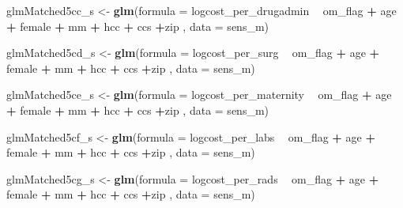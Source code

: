 \documentclass[]{article}
\newenvironment{Shaded}{\begin{snugshade}}{\end{snugshade}}
\newcommand{\KeywordTok}[1]{\textcolor[rgb]{0.13,0.29,0.53}{\textbf{#1}}}
\newcommand{\DataTypeTok}[1]{\textcolor[rgb]{0.13,0.29,0.53}{#1}}
\newcommand{\StringTok}[1]{\textcolor[rgb]{0.31,0.60,0.02}{#1}}
\newcommand{\OperatorTok}[1]{\textcolor[rgb]{0.81,0.36,0.00}{\textbf{#1}}}
\newcommand{\NormalTok}[1]{#1}
\begin{document}
\begin{Shaded}
\begin{Highlighting}[]
\NormalTok{glmMatched5cc_s <-}\StringTok{ }\KeywordTok{glm}\NormalTok{(}\DataTypeTok{formula =}\NormalTok{ logcost_per_drugadmin }\OperatorTok{~}\StringTok{ }\NormalTok{om_flag }\OperatorTok{+}\StringTok{ }\NormalTok{age }\OperatorTok{+}\StringTok{ }\NormalTok{female }\OperatorTok{+}\StringTok{ }\NormalTok{mm }\OperatorTok{+}\StringTok{ }\NormalTok{hcc }\OperatorTok{+}\StringTok{ }\NormalTok{ccs }\OperatorTok{+}\NormalTok{zip ,}
                     \DataTypeTok{data    =}\NormalTok{ sens_m)}

\NormalTok{glmMatched5cd_s <-}\StringTok{ }\KeywordTok{glm}\NormalTok{(}\DataTypeTok{formula =}\NormalTok{ logcost_per_surg }\OperatorTok{~}\StringTok{ }\NormalTok{om_flag }\OperatorTok{+}\StringTok{ }\NormalTok{age }\OperatorTok{+}\StringTok{ }\NormalTok{female }\OperatorTok{+}\StringTok{ }\NormalTok{mm }\OperatorTok{+}\StringTok{ }\NormalTok{hcc }\OperatorTok{+}\StringTok{ }\NormalTok{ccs }\OperatorTok{+}\NormalTok{zip ,}
                     \DataTypeTok{data    =}\NormalTok{ sens_m)}

\NormalTok{glmMatched5ce_s <-}\StringTok{ }\KeywordTok{glm}\NormalTok{(}\DataTypeTok{formula =}\NormalTok{ logcost_per_maternity }\OperatorTok{~}\StringTok{ }\NormalTok{om_flag }\OperatorTok{+}\StringTok{ }\NormalTok{age }\OperatorTok{+}\StringTok{ }\NormalTok{female }\OperatorTok{+}\StringTok{ }\NormalTok{mm }\OperatorTok{+}\StringTok{ }\NormalTok{hcc }\OperatorTok{+}\StringTok{ }\NormalTok{ccs }\OperatorTok{+}\NormalTok{zip ,}
                     \DataTypeTok{data    =}\NormalTok{ sens_m)}

\NormalTok{glmMatched5cf_s <-}\StringTok{ }\KeywordTok{glm}\NormalTok{(}\DataTypeTok{formula =}\NormalTok{ logcost_per_labs }\OperatorTok{~}\StringTok{ }\NormalTok{om_flag }\OperatorTok{+}\StringTok{ }\NormalTok{age }\OperatorTok{+}\StringTok{ }\NormalTok{female }\OperatorTok{+}\StringTok{ }\NormalTok{mm }\OperatorTok{+}\StringTok{ }\NormalTok{hcc }\OperatorTok{+}\StringTok{ }\NormalTok{ccs }\OperatorTok{+}\NormalTok{zip ,}
                     \DataTypeTok{data    =}\NormalTok{ sens_m)}

\NormalTok{glmMatched5cg_s <-}\StringTok{ }\KeywordTok{glm}\NormalTok{(}\DataTypeTok{formula =}\NormalTok{ logcost_per_rads }\OperatorTok{~}\StringTok{ }\NormalTok{om_flag }\OperatorTok{+}\StringTok{ }\NormalTok{age }\OperatorTok{+}\StringTok{ }\NormalTok{female }\OperatorTok{+}\StringTok{ }\NormalTok{mm }\OperatorTok{+}\StringTok{ }\NormalTok{hcc }\OperatorTok{+}\StringTok{ }\NormalTok{ccs }\OperatorTok{+}\NormalTok{zip ,}
                     \DataTypeTok{data    =}\NormalTok{ sens_m)}
\end{Highlighting}
\end{Shaded}
\end{document}
